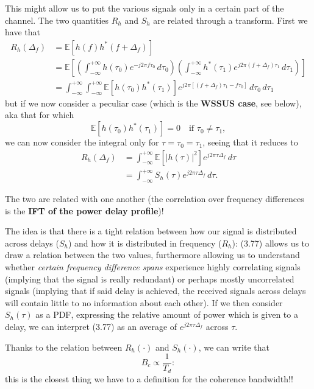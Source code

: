 \documentclass[a4paper, 12pt]{book}
\begin{document}
This might allow us to put the various signals only in a certain part of the channel. The two quantities $R_h$ and $S_h$ are related through a transform.
First we have that
\begin{align}
    R_h(\Delta_f) &= \mathbb{E}[h(f)h^*(f+\Delta_f)] \tag{3.73} \\
    &= \mathbb{E} \left[ \left( \int_{-\infty}^{+\infty} h(\tau_0)e^{-j2\pi f \tau_0} \, d\tau_0 \right) \left( \int_{-\infty}^{+\infty} h^*(\tau_1)e^{j2\pi (f+\Delta_f) \tau_1} \, d\tau_1 \right) \right] \tag{3.74} \\
    &= \int_{-\infty}^{+\infty} \int_{-\infty}^{+\infty} \mathbb{E}[h(\tau_0)h^*(\tau_1)] e^{j2\pi [(f+\Delta_f)\tau_1 - f\tau_0]} \, d\tau_0 \, d\tau_1 \tag{3.75}
\end{align}
but if we now consider a peculiar case (which is the \textbf{WSSUS case}, see below), aka that for which
\[
\mathbb{E}[h(\tau_0)h^*(\tau_1)] = 0 \quad \text{if } \tau_0 \neq \tau_1,
\]
we can now consider the integral only for $\tau = \tau_0 = \tau_1$, seeing that it reduces to
\begin{align}
    R_h(\Delta_f) &= \int_{-\infty}^{+\infty} \mathbb{E}[|h(\tau)|^2] e^{j2\pi \tau \Delta_f} \, d\tau \tag{3.76} \\
    &= \int_{-\infty}^{+\infty} S_h(\tau) e^{j2\pi \tau \Delta_f} \, d\tau . \tag{3.77}
\end{align}

The two are related with one another (the correlation over frequency differences is the \textbf{IFT of the power delay profile})!


\begin{purplebox}
The idea is that there is a tight relation between how our signal is distributed across delays ($S_h$) and how it is distributed in frequency ($R_h$): (3.77) allows us to draw a relation between the two values, furthermore allowing us to understand whether \textit{certain frequency difference spans} experience highly correlating signals (implying that the signal is really redundant) or perhaps mostly uncorrelated signals (implying that if said delay is achieved, the received signals across delays will contain little to no information about each other).
If we then consider $S_h(\tau)$ as a PDF, expressing the relative amount of power which is given to a delay, we can interpret (3.77) as an average of $e^{j2\pi\tau\Delta_f}$ across $\tau$.
\end{purplebox}

\begin{bluebox}
Thanks to the relation between $R_h(\cdot)$ and $S_h(\cdot)$, we can write that
\begin{equation}
    B_c \propto \frac{1}{T_d} : \tag{3.78}
\end{equation}
this is the closest thing we have to a definition for the coherence bandwidth!!
\end{bluebox}
\end{document}
